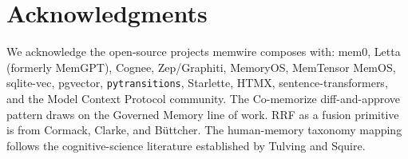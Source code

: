 \documentclass[11pt,letterpaper,twocolumn]{article}
\begin{document}
\section*{Acknowledgments}

We acknowledge the open-source projects memwire composes with: mem0, Letta (formerly MemGPT), Cognee, Zep/Graphiti, MemoryOS, MemTensor MemOS, sqlite-vec, pgvector, \texttt{pytransitions}, Starlette, HTMX, sentence-transformers, and the Model Context Protocol community. The Co-memorize diff-and-approve pattern draws on the Governed Memory line of work. RRF as a fusion primitive is from Cormack, Clarke, and B{\"u}ttcher. The human-memory taxonomy mapping follows the cognitive-science literature established by Tulving and Squire.



\end{document}
